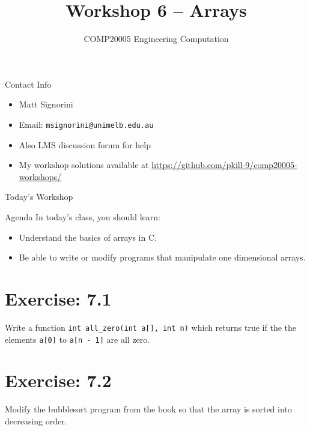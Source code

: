 \documentclass{beamer}
\title{Workshop 6 -- Arrays}
\author{COMP20005 Engineering Computation}
\institute{The University of Melbourne}
\begin{document}
\renewcommand{\tt}[1]{\texttt{#1}}

\begin{frame}
    \titlepage
\end{frame}

\begin{frame}{Contact Info}
    \begin{itemize}
        \item Matt Signorini
        \item Email: \tt{msignorini@unimelb.edu.au}
        \item Also LMS discussion forum for help
        \item My workshop solutions available at \url{https://github.com/pkill-9/comp20005-workshops/}
    \end{itemize}
\end{frame}

\begin{frame}{Today's Workshop}
    \begin{block}{Agenda}
        In today's class, you should learn:
        \begin{itemize}
            \item Understand the basics of arrays in C.
            \item Be able to write or modify programs that manipulate one
                dimensional arrays.
        \end{itemize}
    \end{block}
\end{frame}

\section{Exercise: 7.1}

\begin{frame}{7.1}
    Write a function \tt{int all\_zero(int a[], int n)} which returns true
    if the the elements \tt{a[0]} to \tt{a[n - 1]} are all zero.
\end{frame}

\section{Exercise: 7.2}

\begin{frame}{7.2}
    Modify the bubblesort program from the book so that the array is sorted
    into decreasing order.
\end{frame}
\end{document}
